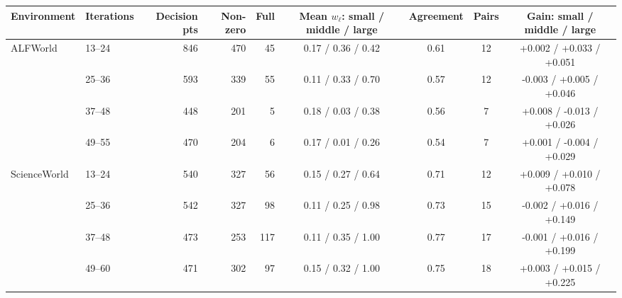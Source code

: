 \begin{tabular}{l l r r r c c c c c}
\toprule
Environment & Iterations & Decision pts & Non-zero & Full & Mean $w_\ell$: small / middle / large & Agreement & Pairs & \multicolumn{2}{c}{Gain: small / middle / large} \\
\midrule
ALFWorld & 13--24 & 846 & 470 & 45 & 0.17 / 0.36 / 0.42 & 0.61 & 12 & \multicolumn{2}{c}{+0.002 / +0.033 / +0.051} \\
 & 25--36 & 593 & 339 & 55 & 0.11 / 0.33 / 0.70 & 0.57 & 12 & \multicolumn{2}{c}{-0.003 / +0.005 / +0.046} \\
 & 37--48 & 448 & 201 & 5 & 0.18 / 0.03 / 0.38 & 0.56 & 7 & \multicolumn{2}{c}{+0.008 / -0.013 / +0.026} \\
 & 49--55 & 470 & 204 & 6 & 0.17 / 0.01 / 0.26 & 0.54 & 7 & \multicolumn{2}{c}{+0.001 / -0.004 / +0.029} \\
\midrule
ScienceWorld & 13--24 & 540 & 327 & 56 & 0.15 / 0.27 / 0.64 & 0.71 & 12 & \multicolumn{2}{c}{+0.009 / +0.010 / +0.078} \\
 & 25--36 & 542 & 327 & 98 & 0.11 / 0.25 / 0.98 & 0.73 & 15 & \multicolumn{2}{c}{-0.002 / +0.016 / +0.149} \\
 & 37--48 & 473 & 253 & 117 & 0.11 / 0.35 / 1.00 & 0.77 & 17 & \multicolumn{2}{c}{-0.001 / +0.016 / +0.199} \\
 & 49--60 & 471 & 302 & 97 & 0.15 / 0.32 / 1.00 & 0.75 & 18 & \multicolumn{2}{c}{+0.003 / +0.015 / +0.225} \\
\bottomrule
\end{tabular}
